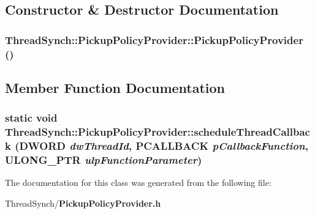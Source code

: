 \subsection{Constructor \& Destructor Documentation}
\subsubsection{\setlength{\rightskip}{0pt plus 5cm}Thread\-Synch::Pickup\-Policy\-Provider::Pickup\-Policy\-Provider ()\hspace{0.3cm}{\tt  [private]}}\label{class_thread_synch_1_1_pickup_policy_provider_8adf7585f9c6b41cebf836b04624188b}




\subsection{Member Function Documentation}
\subsubsection{\setlength{\rightskip}{0pt plus 5cm}static void Thread\-Synch::Pickup\-Policy\-Provider::schedule\-Thread\-Callback (DWORD {\em dw\-Thread\-Id}, {\bf PCALLBACK} {\em p\-Callback\-Function}, ULONG\_\-PTR {\em ulp\-Function\-Parameter})\hspace{0.3cm}{\tt  [static]}}\label{class_thread_synch_1_1_pickup_policy_provider_d57675412b094616d74060cb8e2dbad5}




The documentation for this class was generated from the following file:\begin{CompactItemize}
\item 
Thread\-Synch/{\bf Pickup\-Policy\-Provider.h}\end{CompactItemize}
